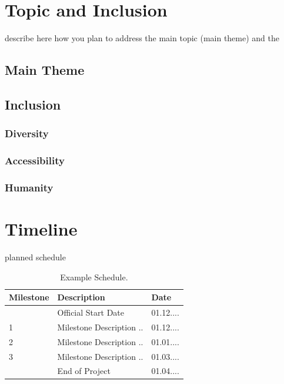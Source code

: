 \documentclass[a4paper]{scrreprt}
\begin{document}


\chapter{Topic and Inclusion }

describe here how you plan to address the main topic (main theme) and the 

\section{Main Theme}
\section{Inclusion}

\subsection{Diversity}
\subsection{Accessibility}
\subsection{Humanity}




\chapter{Timeline}

planned schedule 

\begin{table}[h]
\centering
\begin{tabular}{|l|l|l|}
\hline
Milestone & Description & Date \\\hline
& Official Start Date & 01.12.... \\
1 & Milestone Description ..  & 01.12.... \\
2 & Milestone Description ..  & 01.01.... \\
3 & Milestone Description ..  & 01.03.... \\
& End of Project & 01.04.... \\
\hline
\end{tabular}
\caption{\label{tab:schedule}Example Schedule.}
\end{table}
\end{document}

